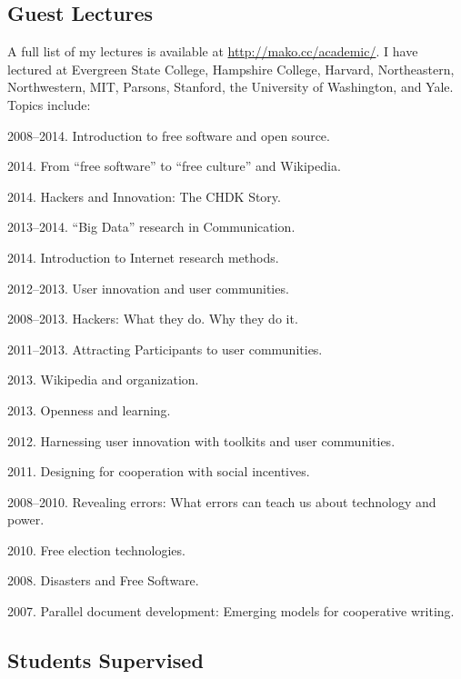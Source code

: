\documentclass[10pt]{article}
\newenvironment{cvlist}{
\begin{list}{}{\leftmargin=3.0em \itemindent=-3.0em}
  \setlength{\itemsep}{0pt}
  \setlength{\parskip}{0em}
  \setlength{\parsep}{1em}
  \setlength{\parindent}{0em}}
{\vspace{1em}
\end{list}}
\begin{document}
\subsection{Guest Lectures}

A full list of my lectures is available at \url{http://mako.cc/academic/}. I have lectured at Evergreen State College, Hampshire College, Harvard, Northeastern, Northwestern, MIT, Parsons, Stanford, the University of Washington, and Yale. Topics include:

\begin{cvlist}

\item 2008--2014. Introduction to free software and open source.
\item 2014. From ``free software'' to ``free culture'' and Wikipedia.
\item 2014. Hackers and Innovation: The CHDK Story.
\item 2013--2014. ``Big Data'' research in Communication.
\item 2014. Introduction to Internet research methods.
\item 2012--2013. User innovation and user communities.
\item 2008--2013. Hackers: What they do. Why they do it.
\item 2011--2013. Attracting Participants to user communities.
\item 2013. Wikipedia and organization.
\item 2013. Openness and learning.
\item 2012. Harnessing user innovation with toolkits and user communities.
\item 2011. Designing for cooperation with social incentives.
\item 2008--2010. Revealing errors: What errors can teach us about technology and power.
\item 2010. Free election technologies.
\item 2008. Disasters and Free Software.
\item 2007. Parallel document development: Emerging models for cooperative writing.
\end{cvlist}

\subsection{Students Supervised}
\end{document}
